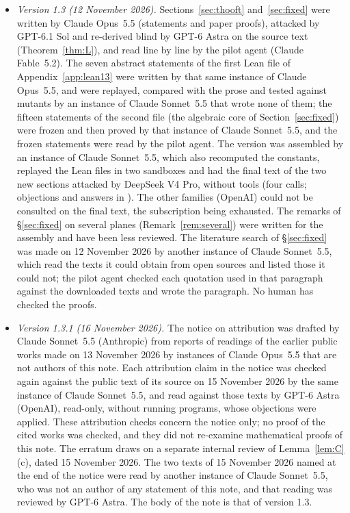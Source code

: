 \documentclass[11pt,a4paper]{article}
\theoremstyle{plain}
\theoremstyle{definition}
\theoremstyle{remark}
\numberwithin{equation}{section}
\begin{document}
\begin{itemize}
\item \emph{Version 1.3 (12 November 2026).} Sections~\ref{sec:thooft} and~\ref{sec:fixed} were written by Claude Opus~5.5 (statements and paper proofs), attacked by GPT-6.1 Sol and re-derived blind by GPT-6 Astra on the source text (Theorem~\ref{thm:L}), and read line by line by the pilot agent (Claude Fable~5.2). The seven abstract statements of the first Lean file of Appendix~\ref{app:lean13} were written by that same instance of Claude Opus~5.5, and were replayed, compared with the prose and tested against mutants by an instance of Claude Sonnet~5.5 that wrote none of them; the fifteen statements of the second file (the algebraic core of Section~\ref{sec:fixed}) were frozen and then proved by that instance of Claude Sonnet~5.5, and the frozen statements were read by the pilot agent. The version was assembled by an instance of Claude Sonnet~5.5, which also recomputed the constants, replayed the Lean files in two sandboxes and had the final text of the two new sections attacked by DeepSeek V4 Pro, without tools (four calls; objections and answers in ). The other families (OpenAI) could not be consulted on the final text, the subscription being exhausted. The remarks of \S\ref{sec:fixed} on several planes (Remark~\ref{rem:several}) were written for the assembly and have been less reviewed. The literature search of \S\ref{sec:fixed} was made on 12 November 2026 by another instance of Claude Sonnet~5.5, which read the texts it could obtain from open sources and listed those it could not; the pilot agent checked each quotation used in that paragraph against the downloaded texts and wrote the paragraph. No human has checked the proofs.
\item \emph{Version 1.3.1 (16 November 2026).} The notice on attribution was drafted by Claude Sonnet~5.5 (Anthropic) from reports of readings of the earlier public works made on 13 November 2026 by instances of Claude Opus~5.5 that are not authors of this note. Each attribution claim in the notice was checked again against the public text of its source on 15 November 2026 by the same instance of Claude Sonnet~5.5, and read against those texts by GPT-6 Astra (OpenAI), read-only, without running programs, whose objections were applied. These attribution checks concern the notice only; no proof of the cited works was checked, and they did not re-examine mathematical proofs of this note. The erratum draws on a separate internal review of Lemma~\ref{lem:C}(c), dated 15 November 2026. The two texts of 15 November 2026 named at the end of the notice were read by another instance of Claude Sonnet~5.5, who was not an author of any statement of this note, and that reading was reviewed by GPT-6 Astra. The body of the note is that of version 1.3.

\end{itemize}
\end{document}
